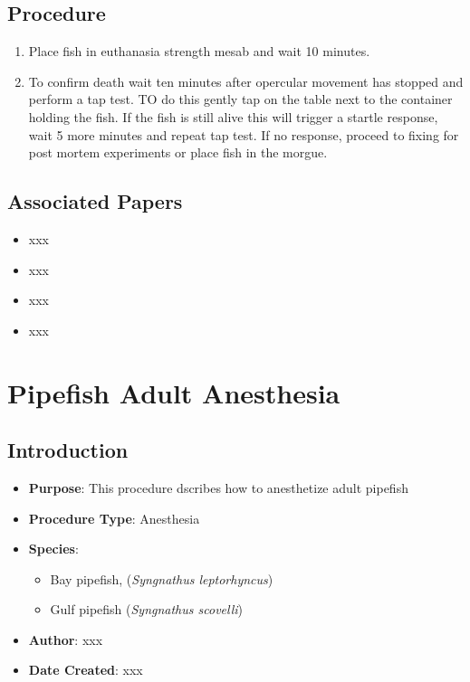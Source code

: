 \documentclass[
  letterpaper,
  DIV=11,
  numbers=noendperiod]{scrreprt}
\providecommand{\tightlist}{%
  \setlength{\itemsep}{0pt}\setlength{\parskip}{0pt}}\usepackage{longtable,booktabs,array}
\begin{document}
\hypertarget{procedure-36}{%
\section{Procedure}\label{procedure-36}}

\begin{enumerate}
\def\labelenumi{\arabic{enumi}.}
\tightlist
\item
  Place fish in euthanasia strength mesab and wait 10 minutes.
\item
  To confirm death wait ten minutes after opercular movement has stopped
  and perform a tap test. TO do this gently tap on the table next to the
  container holding the fish. If the fish is still alive this will
  trigger a startle response, wait 5 more minutes and repeat tap test.
  If no response, proceed to fixing for post mortem experiments or place
  fish in the morgue.
\end{enumerate}

\hypertarget{associated-papers-21}{%
\section{Associated Papers}\label{associated-papers-21}}

\begin{itemize}
\tightlist
\item
  xxx
\item
  xxx
\item
  xxx
\item
  xxx
\end{itemize}

\hypertarget{sec-husbandry_anesth_pipefish}{%
\chapter{Pipefish Adult
Anesthesia}\label{sec-husbandry_anesth_pipefish}}

\hypertarget{introduction-38}{%
\section{Introduction}\label{introduction-38}}

\begin{itemize}
\tightlist
\item
  \textbf{Purpose}: This procedure dscribes how to anesthetize adult
  pipefish
\item
  \textbf{Procedure Type}: Anesthesia
\item
  \textbf{Species}:

  \begin{itemize}
  \tightlist
  \item
    Bay pipefish, (\emph{Syngnathus leptorhyncus})
  \item
    Gulf pipefish (\emph{Syngnathus scovelli})
  \end{itemize}
\item
  \textbf{Author}: xxx
\item
  \textbf{Date Created}: xxx
\end{itemize}
\end{document}
